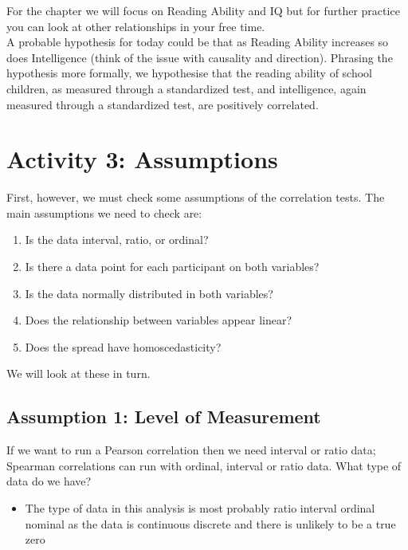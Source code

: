 \documentclass[]{book}
\providecommand{\tightlist}{%
  \setlength{\itemsep}{0pt}\setlength{\parskip}{0pt}}
\begin{document}
For the chapter we will focus on Reading Ability and IQ but for further practice you can look at other relationships in your free time.\\
A probable hypothesis for today could be that as Reading Ability increases so does Intelligence (think of the issue with causality and direction). Phrasing the hypothesis more formally, we hypothesise that the reading ability of school children, as measured through a standardized test, and intelligence, again measured through a standardized test, are positively correlated.

\hypertarget{activity-3-assumptions}{%
\section{Activity 3: Assumptions}\label{activity-3-assumptions}}

First, however, we must check some assumptions of the correlation tests. The main assumptions we need to check are:

\begin{enumerate}
\def\labelenumi{\arabic{enumi}.}
\tightlist
\item
  Is the data interval, ratio, or ordinal?
\item
  Is there a data point for each participant on both variables?
\item
  Is the data normally distributed in both variables?
\item
  Does the relationship between variables appear linear?
\item
  Does the spread have homoscedasticity?
\end{enumerate}

We will look at these in turn.

\hypertarget{assumption-1-level-of-measurement}{%
\subsection{Assumption 1: Level of Measurement}\label{assumption-1-level-of-measurement}}

If we want to run a Pearson correlation then we need interval or ratio data; Spearman correlations can run with ordinal, interval or ratio data. What type of data do we have?

\begin{itemize}
\tightlist
\item
  The type of data in this analysis is most probably ratio interval ordinal nominal as the data is continuous discrete and there is unlikely to be a true zero
\end{itemize}
\end{document}
